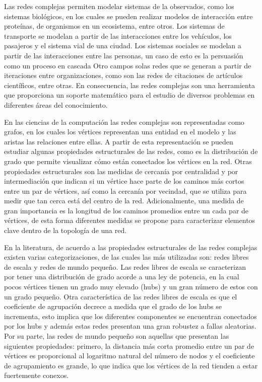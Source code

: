 Las redes complejas permiten modelar sistemas de la observados, como los sistemas biológicos\cite{Costa2008}, en los cuales se pueden realizar modelos de interacción entre proteínas, de organismos en un ecosistema, entre otros. Los sistemas de transporte se modelan a partir de las interacciones entre los vehículos, los pasajeros y el sistema vial de una ciudad\cite{Wu2018}. Los sistemas sociales se modelan a partir de las interacciones entre las personas, un caso de esto es la persuasión como un proceso en cascada\cite{Huang2016} Otro campos solas redes que se generan a partir de iteraciones entre organizaciones, como son las redes de citaciones de artículos científicos\cite{Zhang2013}, entre otras. En consecuencia, las redes complejas son una herramienta que proporciona un soporte matemático para el estudio de diversos problemas en diferentes áreas del conocimiento.

En las ciencias de la computación las redes complejas\cite{BarabasiNetwork} son representadas como grafos, en los cuales los vértices representan una entidad en el modelo y las aristas las relaciones entre ellas. A partir de esta representación se pueden estudiar algunas propiedades estructurales de las redes, como es la distribución de grado que permite visualizar cómo están conectados los vértices en la red. Otras propiedades estructurales son las medidas de cercanía por centralidad y por intermediación que indican si un vértice hace parte de los caminos más cortos entre un par de vértices, así como la cercanía por vecindad, que se utiliza para medir que tan cerca está del centro de la red. Adicionalmente, una medida de gran importancia es la longitud de los caminos promedios entre un cada par de vértices, de esta forma diferentes medidas se propone para caracterizar elementos clave dentro de la topología de una red.

En la literatura, de acuerdo a las propiedades estructurales de las redes complejas existen varias categorizaciones, de las cuales las más utilizadas son: redes libres de escala y redes de mundo pequeño. Las redes libres de escala\cite{Albert2002} se caracterizan por tener una distribución de grado acorde a una ley de potencia, en la cual pocos vértices tienen un grado muy elevado (hubs) y un gran número de estos con un grado pequeño. Otra característica de las redes libres de escala es que el coeficiente de agrupación decrece a medida que el grado de los hubs se incrementa, esto implica que los diferentes componentes se encuentran conectados por los hubs y además estas redes presentan una gran robustez a fallas aleatorias. Por su parte, las redes de mundo pequeño\cite{Amaral2000} son aquellas que presentan las siguientes propiedades: primero, la distancia más corta promedio entre un par de vértices es proporcional al logaritmo natural del número de nodos y el coeficiente de agrupamiento es grande, lo que indica que los vértices de la red tienden a estar fuertemente conexos. 

